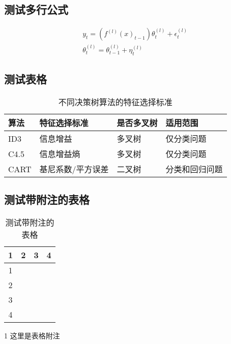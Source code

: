 \documentclass{SUIBEthesis}
\numberwithin{figure}{section}
\numberwithin{table}{section}
\begin{document}
\begin{sloppypar}
\subsection{测试多行公式}
\begin{align}
  &y_t = (f^{(l)}(x)_{t-1})\theta_t^{(l)}+\epsilon_t^{(l)} \label{eq:ml-dma}\\
  &\theta_t^{(l)} = \theta_{t-1}^{(l)}+\eta_t^{(l)}
\end{align}

\subsection{测试表格}
\begin{table}[htbp]
  \centering
  \caption{不同决策树算法的特征选择标准}
  \begin{tabular}{llll}
    \toprule
    \toprule
    算法    & 特征选择标准  & 是否多叉树 & 适用范围\\
    \midrule
    ID3  & 信息增益   & 多叉树 & 仅分类问题\\
    C4.5  & 信息增益熵 & 多叉树 & 仅分类问题\\
    CART  & 基尼系数/平方误差 & 二叉树 & 分类和回归问题\\
    \bottomrule
    \bottomrule
  \end{tabular}%
  \label{tab:2}%
\end{table}%


\subsection{测试带附注的表格}
\begin{table}[htbp]
  \centering
  \caption{测试带附注的表格}
  \begin{threeparttable} 
  \begin{tabular}{cccc}
    \toprule
    \toprule
    1 & 2 & 3 & 4\\
    \midrule
    1& & & \\
    2& & & \\
    3& & & \\
    4& & & \\
    \bottomrule
    \bottomrule
  \end{tabular}
  \begin{tablenotes}
    \footnotesize
    \item[1] 这里是表格附注
  \end{tablenotes}
\end{threeparttable} 


\end{table}
\end{sloppypar}
\end{document}
